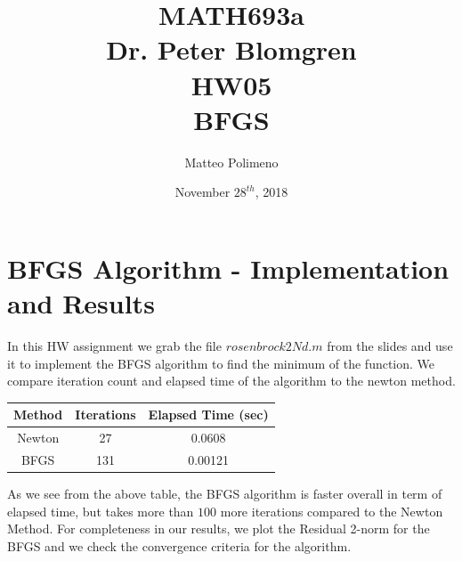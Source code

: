 \documentclass[a4paper,11pt]{article}
\author{Matteo Polimeno}
\date{November $28^{th}$, 2018}
\title{MATH693a\\
	Dr. Peter Blomgren\\
	HW05\\
	BFGS}
\begin{document}
\maketitle
\section*{BFGS Algorithm - Implementation and Results}

In this HW assignment we grab the file $rosenbrock2Nd.m$ from the slides and use it to implement the BFGS algorithm to find the minimum of the function.  We compare iteration count and elapsed time of the algorithm to the newton method.

\begin{center}
	\begin{tabular}{||c |c | c ||} 
		Method & Iterations & Elapsed Time (sec)\\
		\hline\hline
		Newton & 27 & 0.0608\\
		\hline
		BFGS & 131 & 0.00121\\
		\hline\hline
	\end{tabular}
\end{center}

As we see from the above table, the BFGS algorithm is faster overall in term of elapsed time, but takes more than $100$ more iterations compared to the Newton Method.
For completeness in our results, we plot the Residual 2-norm for the BFGS and we check the convergence criteria for the algorithm.
\end{document}
